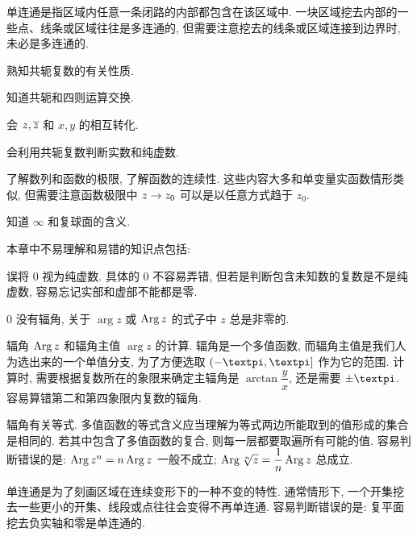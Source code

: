 \begin{conclusion}
\begin{conclusion}
    \item 单连通是指区域内任意一条闭路的内部都包含在该区域中.
    一块区域挖去内部的一些点、线条或区域往往是多连通的,  但需要注意挖去的线条或区域连接到边界时, 未必是多连通的.
  \end{conclusion}
  \item 熟知共轭复数的有关性质.
  \begin{conclusion}
    \item 知道共轭和四则运算交换.
    \item 会 $z,\overline z$ 和 $x,y$ 的相互转化.
    \item 会利用共轭复数判断实数和纯虚数.
  \end{conclusion}
  \item 了解数列和函数的极限, 了解函数的连续性. 这些内容大多和单变量实函数情形类似, 但需要注意函数极限中 $z\rightarrow z_0$ 可以是以任意方式趋于 $z_0$.
  \item 知道 $\infty$ 和复球面的含义.
\end{conclusion}

本章中不易理解和易错的知识点包括:
\begin{enuma}
  \item 误将 $0$ 视为纯虚数. 具体的 $0$ 不容易弄错, 但若是判断包含未知数的复数是不是纯虚数, 容易忘记实部和虚部不能都是零.
  \item $0$ 没有辐角, 关于 $\arg z$ 或 $\operatorname{Arg} z$ 的式子中 $z$ 总是非零的.
  \item 辐角 $\operatorname{Arg} z$ 和辐角主值 $\arg z$ 的计算. 辐角是一个多值函数, 而辐角主值是我们人为选出来的一个单值分支, 为了方便选取 $(-\cpi,\cpi]$ 作为它的范围. 计算时, 需要根据复数所在的象限来确定主辐角是 $\arctan\dfrac yx$, 还是需要 $\pm\cpi$. 
  容易算错第二和第四象限内复数的辐角.
  \item 辐角有关等式. 多值函数的等式含义应当理解为等式两边所能取到的值形成的集合是相同的. 若其中包含了多值函数的复合, 则每一层都要取遍所有可能的值.
  容易判断错误的是: $\operatorname{Arg} z^n=n\operatorname{Arg} z$ 一般不成立; $\operatorname{Arg} \sqrt[n]z=\dfrac1n\operatorname{Arg} z$ 总成立.
  \item 单连通是为了刻画区域在连续变形下的一种不变的特性. 通常情形下, 一个开集挖去一些更小的开集、线段或点往往会变得不再单连通.
  容易判断错误的是: 复平面挖去负实轴和零是单连通的.
\end{enuma}


